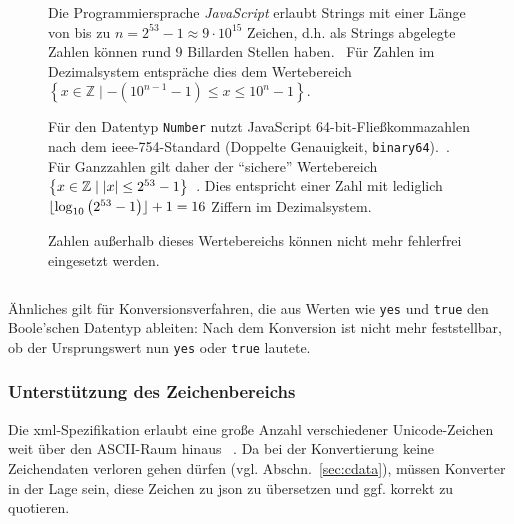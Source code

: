 \begin{figure}[t!]
\begin{example}

    Die Programmiersprache \emph{JavaScript} erlaubt Strings mit einer Länge von bis zu $n=2^{53}-1 \approx 9 \cdot 10^{15}$ Zeichen, d.h. als Strings abgelegte Zahlen können rund 9 Billarden Stellen haben.~\cite[Abschnitt 6.1.4]{ecma262} Für Zahlen im Dezimalsystem entspräche dies dem Wertebereich $\left\{x \in \mathbb{Z} \mid -\left(10^{n-1}-1\right) \leq x \leq 10^{n}-1\right\}$.

    Für den Datentyp \texttt{Number} nutzt JavaScript 64-bit-Fließkommazahlen nach dem \acrshort{ieee}-754-Standard (Doppelte Genauigkeit, \texttt{binary64}).~\cite[Abschnitt 4.3.20]{ieee754,ecma262}. Für Ganzzahlen gilt daher der \enquote{sichere} Wertebereich $\left\{x \in \mathbb{Z} \mid \lvert x\rvert \leq 2^{53}-1\right\}$~\cite[Abschnitt 20.1.2.5]{ecma262}. Dies entspricht einer Zahl mit lediglich $\lfloor\log_{10}\left(2^{53}-1\right)\rfloor+1 = 16$ Ziffern im Dezimalsystem.

    Zahlen außerhalb dieses Wertebereichs können nicht mehr fehlerfrei eingesetzt werden.

    \inputminted[firstline=2,firstnumber=1,mathescape]{javascript}{typeinference.js}
\end{example}
\end{figure}

Ähnliches gilt für Konversionsverfahren, die aus Werten wie \texttt{yes} und \texttt{true} den Boole'schen Datentyp ableiten: Nach dem Konversion ist nicht mehr feststellbar, ob der Ursprungswert nun \texttt{yes} oder \texttt{true} lautete.

\subsubsection{Unterstützung des Zeichenbereichs}

Die \acrshort{xml}-Spezifikation erlaubt eine große Anzahl verschiedener Unicode-Zeichen weit über den ASCII-Raum hinaus ~\cite[Regel~2]{maler2008xml}. Da bei der Konvertierung keine Zeichendaten verloren gehen dürfen (vgl. Abschn.~\ref{sec:cdata}), müssen Konverter in der Lage sein, diese Zeichen zu \acrshort{json} zu übersetzen und ggf. korrekt zu quotieren.

